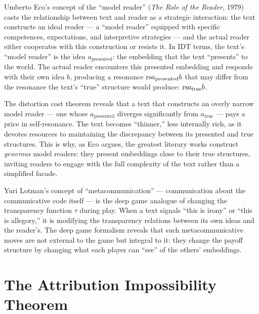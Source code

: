 \begin{interpretation}
\label{interp:ch20:eco_model_reader}
Umberto Eco's concept of the ``model reader'' (\textit{The Role of the
Reader}, 1979) casts the relationship between text and reader as a
strategic interaction: the text constructs an ideal reader --- a ``model
reader'' equipped with specific competences, expectations, and interpretive
strategies --- and the actual reader either cooperates with this
construction or resists it.  In IDT terms, the text's ``model reader'' is
the idea $a_{\text{presented}}$: the embedding that the text ``presents''
to the world.  The actual reader encounters this presented embedding and
responds with their own idea $b$, producing a resonance $\mathrm{rs}{a_{\text{presented}}}{b}$
that may differ from the resonance the text's ``true'' structure would
produce: $\mathrm{rs}{a_{\text{true}}}{b}$.

The distortion cost theorem reveals that a text that constructs an overly
narrow model reader --- one whose $a_{\text{presented}}$ diverges
significantly from $a_{\text{true}}$ --- pays a price in self-resonance.
The text becomes ``thinner,'' less internally rich, as it devotes resources
to maintaining the discrepancy between its presented and true structures.
This is why, as Eco argues, the greatest literary works construct
\emph{generous} model readers: they present embeddings close to their
true structures, inviting readers to engage with the full complexity of
the text rather than a simplified facade.

Yuri Lotman's concept of ``metacommunication'' --- communication about the
communicative code itself --- is the deep game analogue of changing the
transparency function $\tau$ during play.  When a text signals ``this
is irony'' or ``this is allegory,'' it is modifying the transparency
relations between its own ideas and the reader's.  The deep game
formalism reveals that such metacommunicative moves are not external to
the game but integral to it: they change the payoff structure by changing
what each player can ``see'' of the others' embeddings.
\end{interpretation}

\section{The Attribution Impossibility Theorem}

